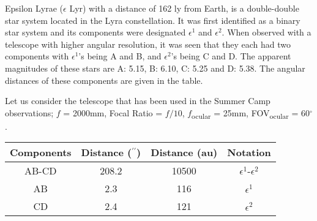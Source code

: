 \documentclass[11pt, a4paper]{exam}
\begin{document}
\begin{questions}
		
		\question
		Epsilon Lyrae ($\epsilon$ Lyr) with a distance of 162 ly from Earth, is a double-double star system located in the Lyra constellation. It was first identified as a binary star system and its components were designated $\epsilon^1$ and $\epsilon^2$. When observed with a telescope with higher angular resolution, it was seen that they each had two components with $\epsilon^1$'s being A and B, and $\epsilon^2$'s being C and D. The apparent magnitudes of these stars are A: 5.15, B: 6.10, C: 5.25 and D: 5.38. The angular distances of these components are given in the table.
		
		Let us consider the telescope that has been used in the Summer Camp observations; \linebreak $f$ = 2000mm, Focal Ratio = $f/10$, $f$\textsubscript{ocular} = 25mm, FOV\textsubscript{ocular} = 60$^\circ$.
		
		\vspace{5pt}
		\begin{tabular}{c c c c}
			\hline
			Components & Distance ($^{\prime\prime}$) & Distance (au) & Notation \\
			\hline
			AB-CD & 208.2 & 10500 & $\epsilon^1$-$\epsilon^2$ \\
			AB & 2.3 & 116 & $\epsilon^1$ \\
			CD & 2.4 & 121 & $\epsilon^2$ \\ [1ex]
			\hline
		\end{tabular}
		\vspace{5pt}
		

\end{questions}
\end{document}
